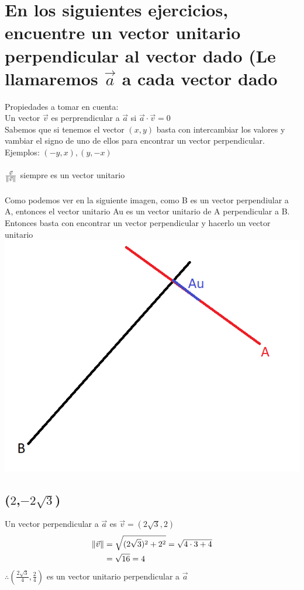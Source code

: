 \documentclass[14pt]{extarticle}
\DeclarePairedDelimiter\norm{\lVert}{\rVert}%
\begin{document}
\section{En los siguientes ejercicios, encuentre un vector unitario perpendicular al vector dado (Le llamaremos $\vec{a}$ a cada vector dado}
Propiedades a tomar en cuenta: \\
Un vector $\vec{v}$ es perprendicular a $\vec{a}$ si $\vec{a}\cdot\vec{v} = 0$  \\
Sabemos que si tenemos el vector $(x,y)$ basta con intercambiar los valores y vambiar el signo de uno de ellos para encontrar un vector perpendicular. Ejemplos: $(-y,x),(y,-x)$ \\  \\
$\frac{\vec{v}}{\norm{\vec{v}}}$ siempre es un vector unitario \\ \\
Como podemos ver en la siguiente imagen, como B es un vector perpendiular a A, entonces el vector unitario Au es un vector unitario de A perpendicular a B. Entonces basta con encontrar un vector perpendicular y hacerlo un vector unitario \\
\includegraphics{vector.png}
    \subsection{($2$,$-2\sqrt{3}$)}
        Un vector perpendicular a $\vec{a}$ es $\vec{v} = (2\sqrt{3},2)$
        \begin{align}
            \notag \norm{\vec{v}} &= \sqrt{(2\sqrt{3})^2+2^2} = \sqrt{4\cdot 3 + 4} \\
           \notag &= \sqrt{16} = 4
         \end{align}
        $\therefore \left(\frac{2\sqrt{3}}{4}, \frac{2}{4}\right)$ es un vector unitario perpendicular a $\vec{a}$
\end{document}
